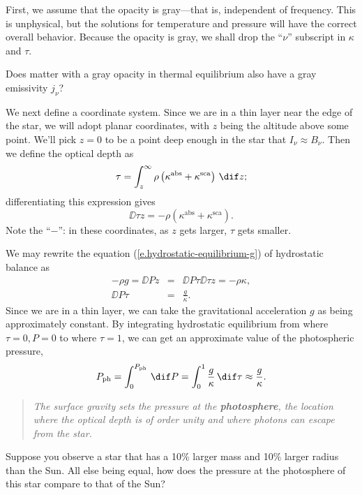 First, we assume that the opacity is gray---that is, independent of frequency. This is unphysical, but the solutions for temperature and pressure will have the correct overall behavior. Because the opacity is gray, we shall drop the ``$\nu$'' subscript in $\kappa$ and $\tau$.

\begin{exercisebox}
Does matter with a gray opacity in thermal equilibrium also have a gray emissivity $j_{\nu}$?
\end{exercisebox}

We next define a coordinate system. Since we are in a thin layer near the edge of the star, we will adopt planar coordinates, with $z$ being the altitude above some point. We'll pick $z=0$ to be a point deep enough in the star that $I_{\nu}\approx B_{\nu}$. Then we define the optical depth as
\begin{equation}\label{e.optical-depth-planar}
	\tau = \int_{z}^{\infty} \rho\left(\kappa^{\mathrm{abs}}+\kappa^{\mathrm{sca}}\right)\,\dif z ;
\end{equation}
differentiating this expression gives
\[
	\DD{\tau}{z} = -\rho\left(\kappa^{\mathrm{abs}}+\kappa^{\mathrm{sca}}\right).
\]
Note the ``$-$'': in these coordinates, as $z$ gets larger, $\tau$ gets smaller.

We may rewrite the equation (\ref{e.hydrostatic-equilibrium-g}) of hydrostatic balance as
\begin{eqnarray}
	-\rho g = \DD{P}{z} &=& \DD{P}{\tau}\DD{\tau}{z} = -\rho\kappa,\nonumber\\
	\DD{P}{\tau} &=& \frac{g}{\kappa}.
\label{e.P-tau}
\end{eqnarray}
Since we are in a thin layer, we can take the gravitational acceleration $g$ as being approximately constant. By integrating hydrostatic equilibrium from where $\tau = 0, P = 0$ to where $\tau = 1$, we can get an approximate value of the photospheric pressure,
\[
	P_{\mathrm{ph}} = \int_{0}^{P_{\mathrm{ph}}}\,\dif P = \int_{0}^{1}\frac{g}{\kappa}\,\dif\tau \approx \frac{g}{\kappa}.
\]
\begin{quote}
\emph{The surface gravity sets the pressure at the \textbf{photosphere}, the location where the optical depth is of order unity and where photons can escape from the star.}
\end{quote}

\begin{exercisebox}
Suppose you observe a star that has a 10\% larger mass and 10\% larger radius than the Sun. All else being equal, how does the pressure at the photosphere of this star compare to that of the Sun?
\end{exercisebox}

